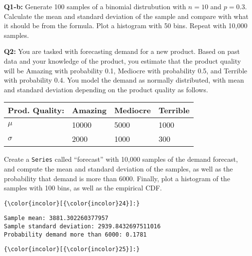 \documentclass{scrreprt}
\begin{document}
    \textbf{Q1-b:} Generate 100 samples of a binomial distrubution with
\(n=10\) and \(p=0.3\). Calculate the mean and standard deviation of the
sample and compare with what it should be from the formula. Plot a
histogram with 50 bins. Repeat with 10,000 samples.

    \textbf{Q2:} You are tasked with forecasting demand for a new product.
Based on past data and your knowledge of the product, you estimate that
the product quality will be Amazing with probability 0.1, Mediocre with
probability 0.5, and Terrible with probability 0.4. You model the demand
as normally distributed, with mean and standard deviation depending on
the product quality as follows.

\begin{longtable}[]{@{}llll@{}}
\toprule
Prod. Quality: & Amazing & Mediocre & Terrible\tabularnewline
\midrule
\endhead
\(\mu\) & 10000 & 5000 & 1000\tabularnewline
\(\sigma\) & 2000 & 1000 & 300\tabularnewline
\bottomrule
\end{longtable}

Create a \texttt{Series} called ``forecast'' with 10,000 samples of the
demand forecast, and compute the mean and standard deviation of the
samples, as well as the probability that demand is more than 6000.
Finally, plot a histogram of the samples with 100 bins, as well as the
empirical CDF.

	
\begin{Verbatim}[commandchars=\\\{\}]
{\color{incolor}[{\color{incolor}24}]:} 
\end{Verbatim}
\begin{Verbatim}[commandchars=\\\{\}]
Sample mean: 3881.302260377957
Sample standard deviation: 2939.8432697511016
Probability demand more than 6000: 0.1781

\end{Verbatim}

	

    
    

    \begin{center}
    \end{center}
   
	
\begin{Verbatim}[commandchars=\\\{\}]
{\color{incolor}[{\color{incolor}25}]:} 
\end{Verbatim}
	
\end{document}
